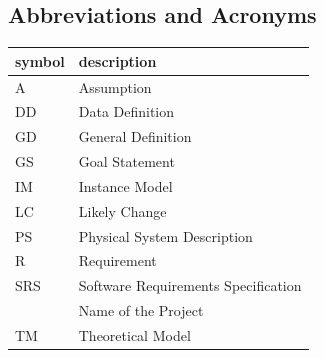 \documentclass[12pt]{article}
\begin{document}

\subsection{Abbreviations and Acronyms}

\renewcommand{\arraystretch}{1.2}
\begin{tabular}{l l} 
  \toprule		
  \textbf{symbol} & \textbf{description}\\
  \midrule 
  A & Assumption\\
  DD & Data Definition\\
  GD & General Definition\\
  GS & Goal Statement\\
  IM & Instance Model\\
  LC & Likely Change\\
  PS & Physical System Description\\
  R & Requirement\\
  SRS & Software Requirements Specification\\
  \progname{} & Name of the Project\\
  TM & Theoretical Model\\
  \bottomrule
\end{tabular}\\




\end{document}
